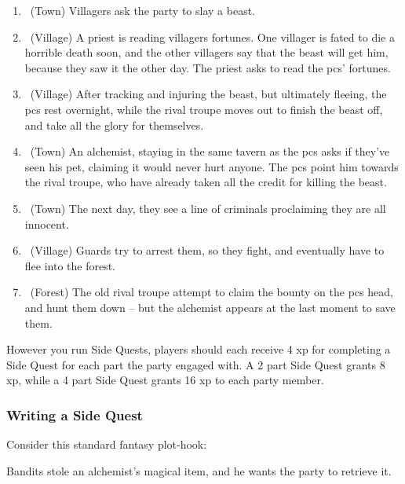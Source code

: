 \begin{multicols}{2}
\begin{enumerate}

  \item
  \sqr~(Town)
  Villagers ask the party to slay a beast.
  \item
  \sqr~(Village)
  A priest is reading villagers fortunes.
  One villager is fated to die a horrible death soon, and the other villagers say that the beast will get him, because they saw it the other day.
  The priest asks to read the \glspl{pc}' fortunes.
  \item
  \sqr~(Village)
  After tracking and injuring the beast, but ultimately fleeing, the \glspl{pc} rest overnight, while the rival troupe moves out to finish the beast off, and take all the glory for themselves.
  \item
  \sqr~(Town)
  An alchemist, staying in the same tavern as the \glspl{pc} asks if they've seen his pet, claiming it would never hurt anyone.
  The \glspl{pc} point him towards the rival troupe, who have already taken all the credit for killing the beast.
  \item
  \sqr~(Town)
  The next day, they see a line of criminals proclaiming they are all innocent.
  \item
  \sqr~(Village)
  Guards try to arrest them, so they fight, and eventually have to flee into the forest.
  \item
  \sqn~(Forest)
  The old rival troupe attempt to claim the bounty on the \glspl{pc} head, and hunt them down -- but the alchemist appears at the last moment to save them.

\end{enumerate}
\noindent

However you run Side Quests, players should each receive 4 \gls{xp} for completing a Side Quest for each part the party engaged with.
A 2 part Side Quest grants 8 \gls{xp}, while a 4 part Side Quest grants 16 \gls{xp} to each party member.

\subsubsection{Writing a Side Quest}

Consider this standard fantasy plot-hook:

\begin{exampletext}

  Bandits stole an alchemist's magical item, and he wants the party to retrieve it.

\end{exampletext}


\end{multicols}
